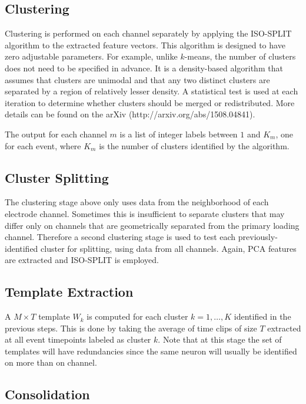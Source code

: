 \documentclass[hidelinks,10pt]{article}
\begin{document}
\subsection {Clustering}

Clustering is performed on each channel separately by applying the ISO-SPLIT algorithm to the extracted feature vectors. This algorithm is designed to have zero adjustable parameters. For example, unlike $k$-means, the number of clusters does not need to be specified in advance. It is a density-based algorithm that assumes that clusters are unimodal and that any two distinct clusters are separated by a region of relatively lesser density. A statistical test is used at each iteration to determine whether clusters should be merged or redistributed. More details can be found on the arXiv (http://arxiv.org/abs/1508.04841).

The output for each channel $m$ is a list of integer labels between $1$ and $K_m$, one for each event, where $K_m$ is the number of clusters identified by the algorithm.

\subsection {Cluster Splitting}

The clustering stage above only uses data from the neighborhood of each electrode channel. Sometimes this is insufficient to separate clusters that may differ only on channels that are geometrically separated from the primary loading channel. Therefore a second clustering stage is used to test each previously-identified cluster for splitting, using data from all channels. Again, PCA features are extracted and ISO-SPLIT is employed.

\subsection {Template Extraction}

A $M\times T$ template $W_k$ is computed for each cluster $k=1,\dots,K$ identified in the previous steps. This is done by taking the average of time clips of size $T$ extracted at all event timepoints labeled as cluster $k$. Note that at this stage the set of templates will have redundancies since the same neuron will usually be identified on more than on channel.

\subsection {Consolidation}
\end{document}
